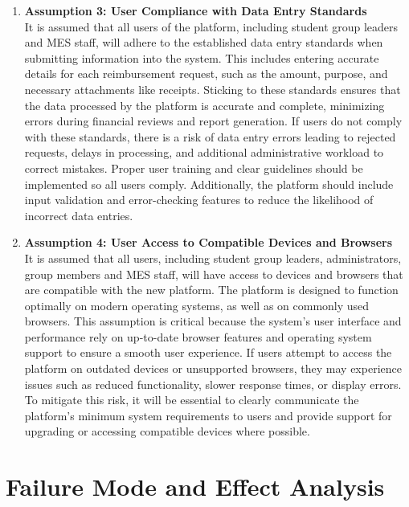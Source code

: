 \documentclass{article}
\begin{document}
\begin{enumerate}
    \item \textbf{Assumption 3: User Compliance with Data Entry Standards} \\
    It is assumed that all users of the platform, including student group leaders and MES staff, will adhere to the established data entry standards when submitting information into the system. This includes entering accurate details for each reimbursement request, such as the amount, purpose, and necessary attachments like receipts. Sticking to these standards ensures that the data processed by the platform is accurate and complete, minimizing errors during financial reviews and report generation. If users do not comply with these standards, there is a risk of data entry errors leading to rejected requests, delays in processing, and additional administrative workload to correct mistakes. Proper user training and clear guidelines should be implemented so all users comply. Additionally, the platform should include input validation and error-checking features to reduce the likelihood of incorrect data entries.

    \item \textbf{Assumption 4: User Access to Compatible Devices and Browsers} \\
    It is assumed that all users, including student group leaders, administrators, group members and MES staff, will have access to devices and browsers that are compatible with the new platform. The platform is designed to function optimally on modern operating systems, as well as on commonly used browsers. This assumption is critical because the system's user interface and performance rely on up-to-date browser features and operating system support to ensure a smooth user experience. If users attempt to access the platform on outdated devices or unsupported browsers, they may experience issues such as reduced functionality, slower response times, or display errors. To mitigate this risk, it will be essential to clearly communicate the platform’s minimum system requirements to users and provide support for upgrading or accessing compatible devices where possible.
    
\end{enumerate}

\section{Failure Mode and Effect Analysis}

\end{document}
